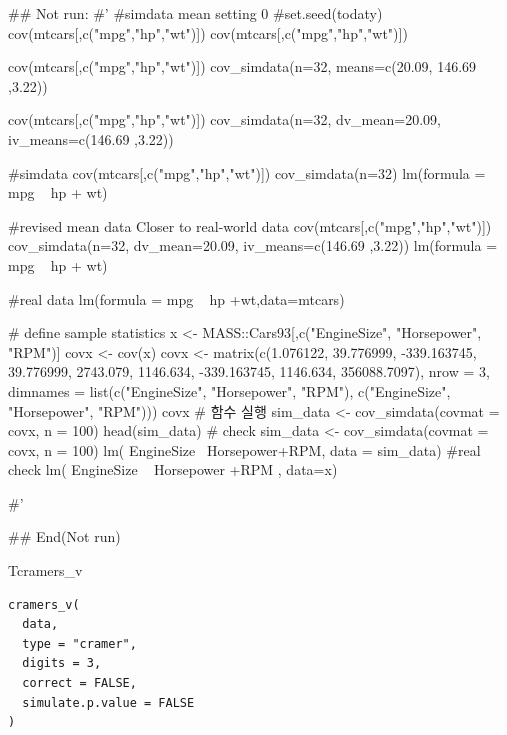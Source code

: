 \documentclass[a4paper]{book}
\begin{document}
%
\begin{Examples}
\begin{ExampleCode}

## Not run: 
#'
#simdata mean setting 0
#set.seed(todaty)
cov(mtcars[,c("mpg","hp","wt")]) %
cov(mtcars[,c("mpg","hp","wt")]) %

cov(mtcars[,c("mpg","hp","wt")]) %
  cov_simdata(n=32, means=c(20.09, 146.69 ,3.22))

cov(mtcars[,c("mpg","hp","wt")]) %
  cov_simdata(n=32, dv_mean=20.09, iv_means=c(146.69 ,3.22))

#simdata
cov(mtcars[,c("mpg","hp","wt")]) %
  cov_simdata(n=32) %
  lm(formula = mpg ~ hp + wt)%

#revised mean data Closer to real-world data
cov(mtcars[,c("mpg","hp","wt")]) %
  cov_simdata(n=32, dv_mean=20.09, iv_means=c(146.69 ,3.22)) %
  lm(formula = mpg ~ hp + wt)%


#real data
lm(formula = mpg ~ hp +wt,data=mtcars)%



# define sample statistics
x <- MASS::Cars93[,c("EngineSize", "Horsepower", "RPM")]
covx <- cov(x)
covx <- matrix(c(1.076122, 39.776999, -339.163745,
                 39.776999, 2743.079, 1146.634,
                 -339.163745, 1146.634, 356088.7097), nrow = 3,
               dimnames = list(c("EngineSize", "Horsepower", "RPM"),
                               c("EngineSize", "Horsepower", "RPM")))
covx
# 함수 실행
sim_data <- cov_simdata(covmat = covx, n = 100)
head(sim_data)
# check
sim_data <- cov_simdata(covmat = covx, n = 100)
lm( EngineSize~ Horsepower+RPM, data = sim_data) %
#real check
lm( EngineSize ~ Horsepower +RPM , data=x)%



#'

## End(Not run)
\end{ExampleCode}
\end{Examples}
%
\begin{Description}
Tcramers\_v
\end{Description}
%
\begin{Usage}
\begin{verbatim}
cramers_v(
  data,
  type = "cramer",
  digits = 3,
  correct = FALSE,
  simulate.p.value = FALSE
)
\end{verbatim}
\end{Usage}
\end{document}
